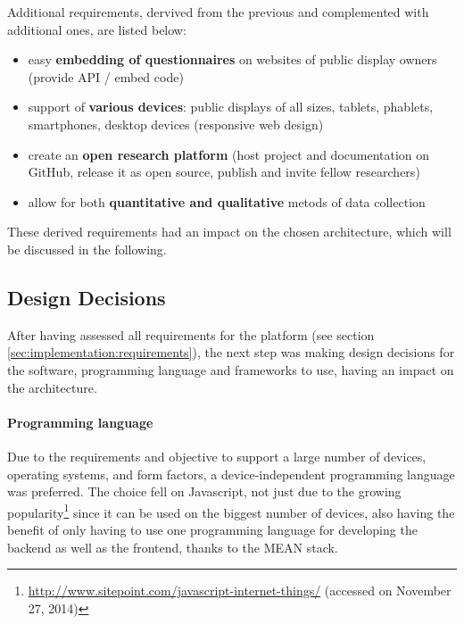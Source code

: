 	Additional requirements, dervived from the previous and complemented with additional ones, are listed below:

	\begin{itemize}[itemsep=0pt] 
	\item easy \textbf{embedding of questionnaires} on websites of public display owners (provide API / embed code)
	\item support of \textbf{various devices}: public displays of all sizes, tablets, phablets, smartphones, desktop devices (responsive web design)
	\item create an \textbf{open research platform} (host project and documentation on GitHub, release it as open source, publish and invite fellow researchers)
	\item allow for both \textbf{quantitative and qualitative} metods of data collection
	\end{itemize}


	These derived requirements had an impact on the chosen architecture, which will be discussed in the following.



\subsection{Design Decisions}
\label{sec:implementation:design-decisions}

	After having assessed all requirements for the platform (see section \ref{sec:implementation:requirements}), the next step was making design decisions for the software, programming language and frameworks to use, having an impact on the architecture.


	\paragraph{Programming language}

		Due to the requirements and objective to support a large number of devices, operating systems, and form factors, a device-independent programming language was preferred. 
		The choice fell on Javascript, not just due to the growing popularity\footnote{\url{http://www.sitepoint.com/javascript-internet-things/} (accessed on November 27, 2014)} since it can be used on the biggest number of devices, also having the benefit of only having to use one programming language for developing the backend as well as the frontend, thanks to the MEAN stack.

